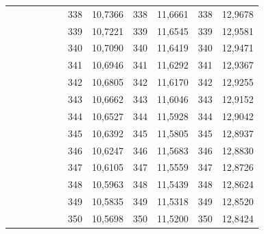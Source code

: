 \documentclass[a4paper,12pt]{article} %
\begin{document}
\begin{longtable}[c]{cccccccccc|c|c|}
	&  &  &  &  & \multicolumn{1}{c|}{} & \multicolumn{1}{c|}{338} & \multicolumn{1}{c|}{10,7366} & \multicolumn{1}{c|}{338} & 11,6661 & 338 & 12,9678 \\ \cline{7-12} 
	&  &  &  &  & \multicolumn{1}{c|}{} & \multicolumn{1}{c|}{339} & \multicolumn{1}{c|}{10,7221} & \multicolumn{1}{c|}{339} & 11,6545 & 339 & 12,9581 \\ \cline{7-12} 
	&  &  &  &  & \multicolumn{1}{c|}{} & \multicolumn{1}{c|}{340} & \multicolumn{1}{c|}{10,7090} & \multicolumn{1}{c|}{340} & 11,6419 & 340 & 12,9471 \\ \cline{7-12} 
	&  &  &  &  & \multicolumn{1}{c|}{} & \multicolumn{1}{c|}{341} & \multicolumn{1}{c|}{10,6946} & \multicolumn{1}{c|}{341} & 11,6292 & 341 & 12,9367 \\ \cline{7-12} 
	&  &  &  &  & \multicolumn{1}{c|}{} & \multicolumn{1}{c|}{342} & \multicolumn{1}{c|}{10,6805} & \multicolumn{1}{c|}{342} & 11,6170 & 342 & 12,9255 \\ \cline{7-12} 
	&  &  &  &  & \multicolumn{1}{c|}{} & \multicolumn{1}{c|}{343} & \multicolumn{1}{c|}{10,6662} & \multicolumn{1}{c|}{343} & 11,6046 & 343 & 12,9152 \\ \cline{7-12} 
	&  &  &  &  & \multicolumn{1}{c|}{} & \multicolumn{1}{c|}{344} & \multicolumn{1}{c|}{10,6527} & \multicolumn{1}{c|}{344} & 11,5928 & 344 & 12,9042 \\ \cline{7-12} 
	&  &  &  &  & \multicolumn{1}{c|}{} & \multicolumn{1}{c|}{345} & \multicolumn{1}{c|}{10,6392} & \multicolumn{1}{c|}{345} & 11,5805 & 345 & 12,8937 \\ \cline{7-12} 
	&  &  &  &  & \multicolumn{1}{c|}{} & \multicolumn{1}{c|}{346} & \multicolumn{1}{c|}{10,6247} & \multicolumn{1}{c|}{346} & 11,5683 & 346 & 12,8830 \\ \cline{7-12} 
	&  &  &  &  & \multicolumn{1}{c|}{} & \multicolumn{1}{c|}{347} & \multicolumn{1}{c|}{10,6105} & \multicolumn{1}{c|}{347} & 11,5559 & 347 & 12,8726 \\ \cline{7-12} 
	&  &  &  &  & \multicolumn{1}{c|}{} & \multicolumn{1}{c|}{348} & \multicolumn{1}{c|}{10,5963} & \multicolumn{1}{c|}{348} & 11,5439 & 348 & 12,8624 \\ \cline{7-12} 
	&  &  &  &  & \multicolumn{1}{c|}{} & \multicolumn{1}{c|}{349} & \multicolumn{1}{c|}{10,5835} & \multicolumn{1}{c|}{349} & 11,5318 & 349 & 12,8520 \\ \cline{7-12} 
	&  &  &  &  & \multicolumn{1}{c|}{} & \multicolumn{1}{c|}{350} & \multicolumn{1}{c|}{10,5698} & \multicolumn{1}{c|}{350} & 11,5200 & 350 & 12,8424 \\ \cline{7-12} 

\end{longtable}
\end{document}
